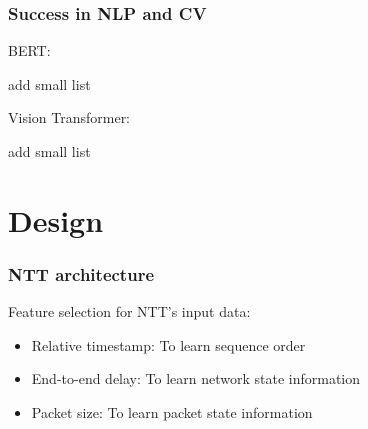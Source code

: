 \documentclass{beamer}
\begin{document}


\begin{frame}
\frametitle{Success in NLP and CV}
BERT:

add small list
\pause

Vision Transformer:

add small list


\end{frame}

\section{Design}


\begin{frame}
\frametitle{NTT architecture}

Feature selection for NTT's input data:
\pause 
\begin{itemize}
    \item<1-> \alert{Relative timestamp:} To learn sequence order
    \item<1-> \alert{End-to-end delay:} To learn network state information
    \item<1-> \alert{Packet size:} To learn packet state information
\end{itemize}

\end{frame}
\end{document}
